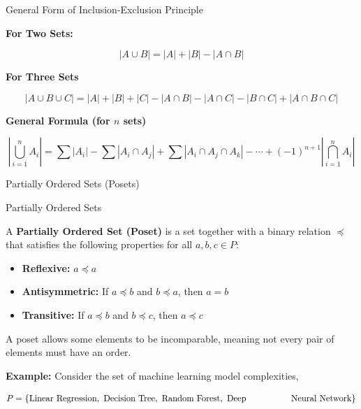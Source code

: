 \documentclass{beamer}
\begin{document}
\begin{frame}{General Form of Inclusion-Exclusion Principle}


\vspace{0.3cm}

\textbf{For Two Sets:}

\[
|A \cup B| = |A| + |B| - |A \cap B|
\]

\vspace{0.3cm}

\textbf{For Three Sets}

\[
|A \cup B \cup C|
=
|A|+|B|+|C|
-
|A\cap B|
-
|A\cap C|
-
|B\cap C|
+
|A\cap B\cap C|
\]

\vspace{0.3cm}

\textbf{General Formula (for $n$ sets)}

\[
\left|\bigcup_{i=1}^{n} A_i\right|
=
\sum |A_i|
-
\sum |A_i\cap A_j|
+
\sum |A_i\cap A_j\cap A_k|
-\cdots+
(-1)^{n+1}
\left|\bigcap_{i=1}^{n} A_i\right|
\]

\end{frame}
\begin{frame}{Partially Ordered Sets (Posets)}
\begin{block}{Partially Ordered Sets}

A \textbf{Partially Ordered Set (Poset)} is a set together with a binary relation $\preceq$ that satisfies the following properties for all $a,b,c \in P$:

\begin{itemize}
    \item \textbf{Reflexive:} $a \preceq a$
    \item \textbf{Antisymmetric:} If $a \preceq b$ and $b \preceq a$, then $a=b$
    \item \textbf{Transitive:} If $a \preceq b$ and $b \preceq c$, then $a \preceq c$
\end{itemize}


A poset allows some elements to be incomparable, meaning not every pair of elements must have an order.
\end{block}
\textbf{Example:}
Consider the set of machine learning model complexities,

\[
P=\{\text{Linear Regression},\ \text{Decision Tree},\ \text{Random Forest},\ \text{Deep}\\\hspace{1.7cm}\text{ Neural Network}\}
\]
\end{frame}
\end{document}
